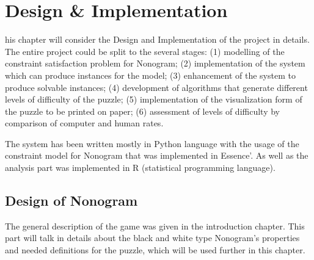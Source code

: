 \let\textcircled=\pgftextcircled
\chapter{Design \& Implementation}
\label{chap:6}


his chapter will consider the Design and Implementation of the project in details. The entire project could be split to the several stages: (1) modelling of the constraint satisfaction problem for Nonogram; (2) implementation of the system which can produce instances for the model; (3) enhancement of the system to produce solvable instances; (4) development of algorithms that generate different levels of difficulty of the puzzle; (5) implementation of the visualization form of the puzzle to be printed on paper; (6) assessment of levels of difficulty by comparison of computer and human rates.

The system has been written mostly in Python language with the usage of the constraint model for Nonogram that was implemented in Essence'. As well as the analysis part was implemented in R (statistical programming language).

\section{Design of Nonogram}
\label{sec:designNono}
The general description of the game was given in the introduction chapter. This part will talk in details about the black and white type Nonogram's properties and needed definitions for the puzzle, which will be used further in this chapter.

